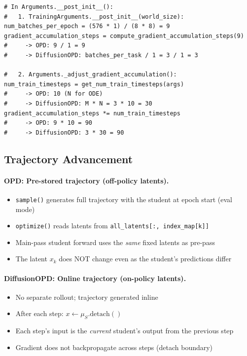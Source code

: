 \documentclass[11pt]{article}
\begin{document}
\begin{lstlisting}
# In Arguments.__post_init__():
#   1. TrainingArguments.__post_init__(world_size):
num_batches_per_epoch = (576 * 1) / (8 * 8) = 9
gradient_accumulation_steps = compute_gradient_accumulation_steps(9)
#     -> OPD: 9 / 1 = 9
#     -> DiffusionOPD: batches_per_task / 1 = 3 / 1 = 3

#   2. Arguments._adjust_gradient_accumulation():
num_train_timesteps = get_num_train_timesteps(args)
#     -> OPD: 10 (N for ODE)
#     -> DiffusionOPD: M * N = 3 * 10 = 30
gradient_accumulation_steps *= num_train_timesteps
#     -> OPD: 9 * 10 = 90
#     -> DiffusionOPD: 3 * 30 = 90
\end{lstlisting}

\subsection{Trajectory Advancement}

\paragraph{OPD: Pre-stored trajectory (off-policy latents).}
\begin{itemize}[nosep]
    \item \texttt{sample()} generates full trajectory with the student at epoch start (eval mode)
    \item \texttt{optimize()} reads latents from \texttt{all\_latents[:, index\_map[k]]}
    \item Main-pass student forward uses the \emph{same} fixed latents as pre-pass
    \item The latent $x_k$ does NOT change even as the student's predictions differ
\end{itemize}

\paragraph{DiffusionOPD: Online trajectory (on-policy latents).}
\begin{itemize}[nosep]
    \item No separate rollout; trajectory generated inline
    \item After each step: $x \leftarrow \mu_S.\text{detach}()$
    \item Each step's input is the \emph{current} student's output from the previous step
    \item Gradient does not backpropagate across steps (detach boundary)
\end{itemize}
\end{document}

